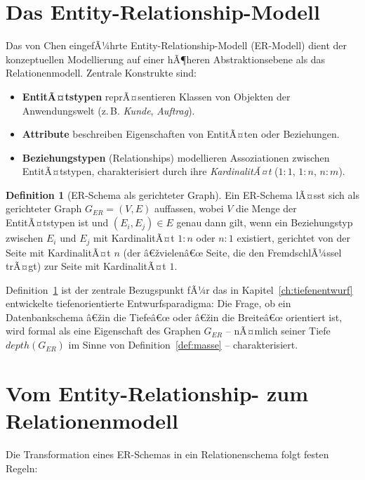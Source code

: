 ﻿\documentclass[a4paper,12pt]{report}
\theoremstyle{definition}
\newtheorem{definition}{Definition}[chapter]
\theoremstyle{remark}
\newcommand{\depth}{\mathit{depth}}
\begin{document}
\section{Das Entity-Relationship-Modell}
\label{sec:ermodell}

Das von Chen eingefÃ¼hrte Entity-Relationship-Modell (ER-Modell) dient
der konzeptuellen Modellierung auf einer hÃ¶heren Abstraktionsebene als
das Relationenmodell. Zentrale Konstrukte sind:

\begin{itemize}
  \item \textbf{EntitÃ¤tstypen} reprÃ¤sentieren Klassen von Objekten der
    Anwendungswelt (z.\,B. \textit{Kunde}, \textit{Auftrag}).
  \item \textbf{Attribute} beschreiben Eigenschaften von EntitÃ¤ten oder
    Beziehungen.
  \item \textbf{Beziehungstypen} (Relationships) modellieren
    Assoziationen zwischen EntitÃ¤tstypen, charakterisiert durch ihre
    \emph{KardinalitÃ¤t} ($1{:}1$, $1{:}n$, $n{:}m$).
\end{itemize}

\begin{definition}[ER-Schema als gerichteter Graph]
\label{def:er-graph}
Ein ER-Schema lÃ¤sst sich als gerichteter Graph $G_{ER} = (V,E)$ auffassen,
wobei $V$ die Menge der EntitÃ¤tstypen ist und
$(E_i, E_j) \in E$ genau dann gilt, wenn ein Beziehungstyp zwischen $E_i$
und $E_j$ mit KardinalitÃ¤t $1{:}n$ oder $n{:}1$ existiert, gerichtet von
der Seite mit KardinalitÃ¤t $n$ (der â€žvielenâ€œ Seite, die den
FremdschlÃ¼ssel trÃ¤gt) zur Seite mit KardinalitÃ¤t $1$.
\end{definition}

Definition~\ref{def:er-graph} ist der zentrale Bezugspunkt fÃ¼r das in
Kapitel~\ref{ch:tiefenentwurf} entwickelte tiefenorientierte
Entwurfsparadigma: Die Frage, ob ein Datenbankschema â€žin die Tiefeâ€œ oder
â€žin die Breiteâ€œ orientiert ist, wird formal als eine Eigenschaft des
Graphen $G_{ER}$ -- nÃ¤mlich seiner Tiefe $\depth(G_{ER})$ im Sinne von
Definition~\ref{def:masse} -- charakterisiert.

\section{Vom Entity-Relationship- zum Relationenmodell}
\label{sec:er-zu-rel}

Die Transformation eines ER-Schemas in ein Relationenschema folgt
festen Regeln:
\end{document}
